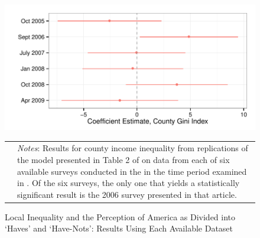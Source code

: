 \begin{figure}[htbp] 
  \caption{Local Inequality and the Perception of America as Divided into `Haves' and `Have-Nots': Results Using Each Available Dataset}
  \label{F:t2_by_survey}
  \begin{center}
    \includegraphics[width=5.25in]{../figures/03_examine_all_available_data_t2_by_survey.pdf}
  \end{center}
  \begin{footnotesize}
  \begin{tabular}{p{.1in} p{5.1in}}
  & \emph{Notes}: Results for county income inequality from replications of the model presented in Table 2 of \citet{Newman2015} on data from each of six available surveys conducted in the in the time period examined in \citet{Newman2015}.  Of the six surveys, the only one that yields a statistically significant result is the 2006 survey presented in that article.
  \end{tabular}
  \end{footnotesize}
\end{figure}



